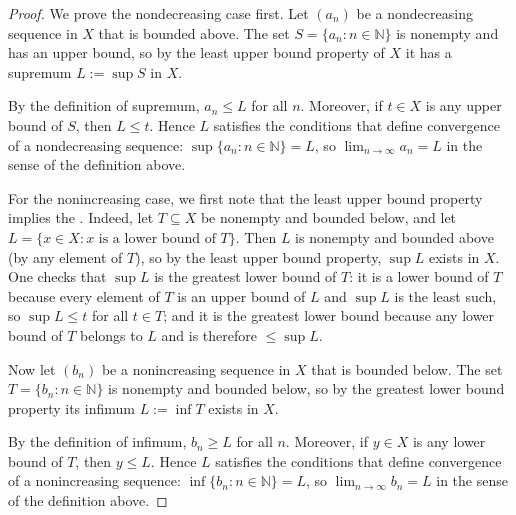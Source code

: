 \begin{proof}
    We prove the nondecreasing case first. Let $(a_n)$ be a nondecreasing sequence in $X$ that is bounded above. The set $S = \{a_n : n \in \mathbb{N}\}$ is nonempty and has an upper bound, so by the least upper bound property of $X$ it has a supremum $L := \sup S$ in $X$.

    By the definition of supremum, $a_n \leq L$ for all $n$. Moreover, if $t \in X$ is any upper bound of $S$, then $L \leq t$. Hence $L$ satisfies the conditions that define convergence of a nondecreasing sequence: $\sup\{a_n : n \in \mathbb{N}\} = L$, so $\lim_{n \to \infty} a_n = L$ in the sense of the definition above.

    For the nonincreasing case, we first note that the least upper bound property implies the . Indeed, let $T \subseteq X$ be nonempty and bounded below, and let $L = \{x \in X : x \text{ is a lower bound of } T\}$. Then $L$ is nonempty and bounded above (by any element of $T$), so by the least upper bound property, $\sup L$ exists in $X$. One checks that $\sup L$ is the greatest lower bound of $T$: it is a lower bound of $T$ because every element of $T$ is an upper bound of $L$ and $\sup L$ is the least such, so $\sup L \leq t$ for all $t \in T$; and it is the greatest lower bound because any lower bound of $T$ belongs to $L$ and is therefore $\leq \sup L$.

    Now let $(b_n)$ be a nonincreasing sequence in $X$ that is bounded below. The set $T = \{b_n : n \in \mathbb{N}\}$ is nonempty and bounded below, so by the greatest lower bound property its infimum $L := \inf T$ exists in $X$.

    By the definition of infimum, $b_n \geq L$ for all $n$. Moreover, if $y \in X$ is any lower bound of $T$, then $y \leq L$. Hence $L$ satisfies the conditions that define convergence of a nonincreasing sequence: $\inf\{b_n : n \in \mathbb{N}\} = L$, so $\lim_{n \to \infty} b_n = L$ in the sense of the definition above.
\end{proof}
